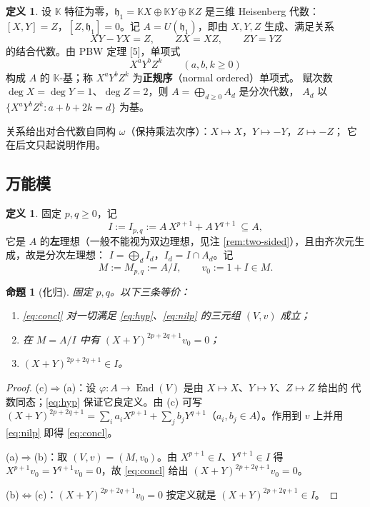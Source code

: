 \documentclass[11pt,UTF8]{ctexart}
\newtheorem{proposition}[theorem]{命题}
\theoremstyle{definition}
\newtheorem{definition}[theorem]{定义}
\newcommand{\End}{\operatorname{End}}
\newcommand{\K}{\mathbb{K}}
\newcommand{\hh}{\mathfrak{h}}
\begin{document}
\begin{definition}\label{def:A}
设 $\K$ 特征为零，$\hh_1=\K X\oplus\K Y\oplus\K Z$ 是三维 Heisenberg 代数：
$[X,Y]=Z$，$[Z,\hh_1]=0$。记 $A=U(\hh_1)$，即由 $X,Y,Z$ 生成、满足关系
\[
XY-YX=Z,\qquad ZX=XZ,\qquad ZY=YZ
\]
的结合代数。由 PBW 定理 [5]，单项式
\[
X^{a}Y^{b}Z^{k}\qquad(a,b,k\ge 0)
\]
构成 $A$ 的 $\K$-基；称 $X^aY^bZ^k$ 为\textbf{正规序}（normal ordered）单项式。
赋次数 $\deg X=\deg Y=1$、$\deg Z=2$，则 $A=\bigoplus_{d\ge0}A_d$ 是分次代数，
$A_d$ 以 $\{X^aY^bZ^k: a+b+2k=d\}$ 为基。
\end{definition}

关系给出对合代数自同构 $\omega$（保持乘法次序）：$X\mapsto X$，$Y\mapsto -Y$，$Z\mapsto -Z$；
它在后文只起说明作用。

\subsection{万能模}

\begin{definition}\label{def:I}
固定 $p,q\ge0$，记
\[
I:=I_{p,q}:=A\,X^{p+1}+A\,Y^{q+1}\ \subseteq A ,
\]
它是 $A$ 的\textbf{左}理想（一般不能视为双边理想，见注 \ref{rem:two-sided}），且由齐次元生成，故是分次左理想：
$I=\bigoplus_d I_d$，$I_d=I\cap A_d$。记
\[
M:=M_{p,q}:=A/I,\qquad v_0:=1+I\in M .
\]
\end{definition}

\begin{proposition}[化归]\label{prop:reduce}
固定 $p,q$。以下三条等价：
\begin{enumerate}[label=(\alph*)]
\item \eqref{eq:concl} 对一切满足 \eqref{eq:hyp}、\eqref{eq:nilp} 的三元组 $(V,v)$ 成立；
\item 在 $M=A/I$ 中有 $(X+Y)^{2p+2q+1}v_0=0$；
\item $(X+Y)^{2p+2q+1}\in I$。
\end{enumerate}
\end{proposition}

\begin{proof}
(c)$\Rightarrow$(a)：设 $\varphi:A\to\End(V)$ 是由 $X\mapsto X$、$Y\mapsto Y$、$Z\mapsto Z$ 给出的
代数同态；\eqref{eq:hyp} 保证它良定义。由 (c) 可写
$(X+Y)^{2p+2q+1}=\sum_i a_iX^{p+1}+\sum_j b_jY^{q+1}$（$a_i,b_j\in A$）。作用到 $v$ 上并用
\eqref{eq:nilp} 即得 \eqref{eq:concl}。

(a)$\Rightarrow$(b)：取 $(V,v)=(M,v_0)$。由 $X^{p+1}\in I$、$Y^{q+1}\in I$ 得
$X^{p+1}v_0=Y^{q+1}v_0=0$，故 \eqref{eq:concl} 给出 $(X+Y)^{2p+2q+1}v_0=0$。

(b)$\Leftrightarrow$(c)：$(X+Y)^{2p+2q+1}v_0=0$ 按定义就是 $(X+Y)^{2p+2q+1}\in I$。
\end{proof}
\end{document}
